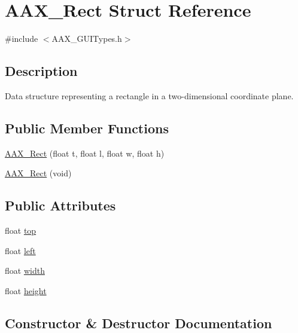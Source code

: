 \hypertarget{a01613}{}\section{A\+A\+X\+\_\+\+Rect Struct Reference}
\label{a01613}


{\ttfamily \#include $<$A\+A\+X\+\_\+\+G\+U\+I\+Types.\+h$>$}



\subsection{Description}
Data structure representing a rectangle in a two-\/dimensional coordinate plane. \subsection*{Public Member Functions}
\begin{DoxyCompactItemize}
\item 
\mbox{\hyperlink{a01613_a6ac06065390fe48a547aacf4de68e297}{A\+A\+X\+\_\+\+Rect}} (float t, float l, float w, float h)
\item 
\mbox{\hyperlink{a01613_a87743f1594fa99d12019861b95893316}{A\+A\+X\+\_\+\+Rect}} (void)
\end{DoxyCompactItemize}
\subsection*{Public Attributes}
\begin{DoxyCompactItemize}
\item 
float \mbox{\hyperlink{a01613_a49731e154df78f0811f271c83c56cdb3}{top}}
\item 
float \mbox{\hyperlink{a01613_a1975750fe0b144a6c6bf5495006e8088}{left}}
\item 
float \mbox{\hyperlink{a01613_a0105870bc2c8d461b76f67c73b9832f5}{width}}
\item 
float \mbox{\hyperlink{a01613_afee27da666682945c9cbfe2599f4ece4}{height}}
\end{DoxyCompactItemize}


\subsection{Constructor \& Destructor Documentation}
\mbox{\label{a01613_a6ac06065390fe48a547aacf4de68e297}} 
